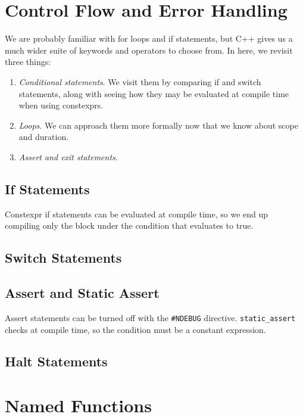 \documentclass{article}
\begin{document}
\section{Control Flow and Error Handling}  

    We are probably familiar with for loops and if statements, but C++ gives us a much wider suite of keywords and operators to choose from. In here, we revisit three things: 
    \begin{enumerate}
      \item \textit{Conditional statements}. We visit them by comparing if and switch statements, along with seeing how they may be evaluated at compile time when using constexprs. 
      \item \textit{Loops}. We can approach them more formally now that we know about scope and duration. 
      \item \textit{Assert and exit statements}. 
    \end{enumerate}

  \subsection{If Statements} 

    Constexpr if statements can be evaluated at compile time, so we end up compiling only the block under the condition that evaluates to true.   

  \subsection{Switch Statements}

  \subsection{Assert and Static Assert} 

    Assert statements can be turned off with the \texttt{\#NDEBUG} directive. \texttt{static\_assert} checks at compile time, so the condition must be a constant expression. 

  \subsection{Halt Statements}

\section{Named Functions} 
\end{document}
